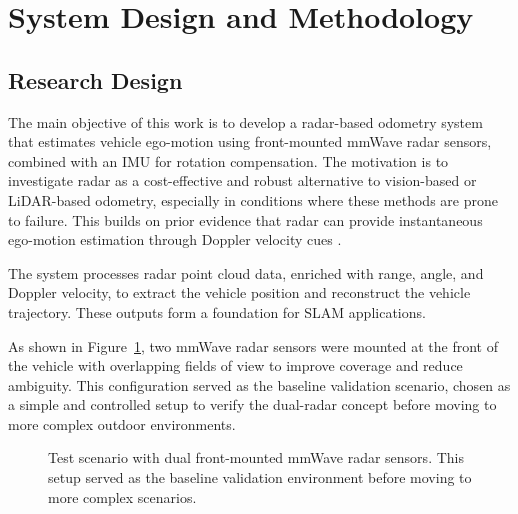 \section{System Design and Methodology}
\subsection{Research Design}

The main objective of this work is to develop a radar-based odometry system that estimates vehicle ego-motion using front-mounted mmWave radar sensors, combined with an IMU for rotation compensation.  
The motivation is to investigate radar as a cost-effective and robust alternative to vision-based or LiDAR-based odometry, especially in conditions where these methods are prone to failure.  
This builds on prior evidence that radar can provide instantaneous ego-motion estimation through Doppler velocity cues \cite{EgoMotion_DopplerRadar}.  

The system processes radar point cloud data, enriched with range, angle, and Doppler velocity, to extract the vehicle position and reconstruct the vehicle trajectory.  
These outputs form a foundation for SLAM applications.  

As shown in Figure~\ref{fig:test_scenario}, two mmWave radar sensors were mounted at the front of the vehicle with overlapping fields of view to improve coverage and reduce ambiguity.  
This configuration served as the baseline validation scenario, chosen as a simple and controlled setup to verify the dual-radar concept before moving to more complex outdoor environments.  

\begin{figure}[!htbp]
    \centering
    \caption{Test scenario with dual front-mounted mmWave radar sensors.  
    This setup served as the baseline validation environment before moving to more complex scenarios.}
    \label{fig:test_scenario}
\end{figure}

